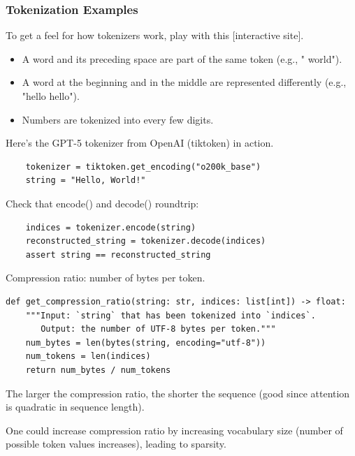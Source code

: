 \documentclass[12pt,twoside]{article}
\begin{document}
\subsubsection*{Tokenization Examples}

To get a feel for how tokenizers work, play with this [interactive site].

\begin{itemize}
    \item A word and its preceding space are part of the same token (e.g., " world").
    \item A word at the beginning and in the middle are represented differently (e.g., "hello hello").
    \item Numbers are tokenized into every few digits.
\end{itemize}

Here's the GPT-5 tokenizer from OpenAI (tiktoken) in action.

\begin{verbatim}
    tokenizer = tiktoken.get_encoding("o200k_base")
    string = "Hello, World!"
\end{verbatim}

Check that encode() and decode() roundtrip:

\begin{verbatim}
    indices = tokenizer.encode(string)  
    reconstructed_string = tokenizer.decode(indices)  
    assert string == reconstructed_string
\end{verbatim}

Compression ratio: number of bytes per token.

\begin{verbatim}
def get_compression_ratio(string: str, indices: list[int]) -> float:  
    """Input: `string` that has been tokenized into `indices`. 
       Output: the number of UTF-8 bytes per token."""
    num_bytes = len(bytes(string, encoding="utf-8"))  
    num_tokens = len(indices)                       
    return num_bytes / num_tokens 
\end{verbatim}

\begin{remark}
    The larger the compression ratio, the shorter the sequence (good since attention is quadratic in sequence length).
\end{remark}

One could increase compression ratio by increasing vocabulary size (number of possible token values increases), leading to sparsity.
\end{document}

